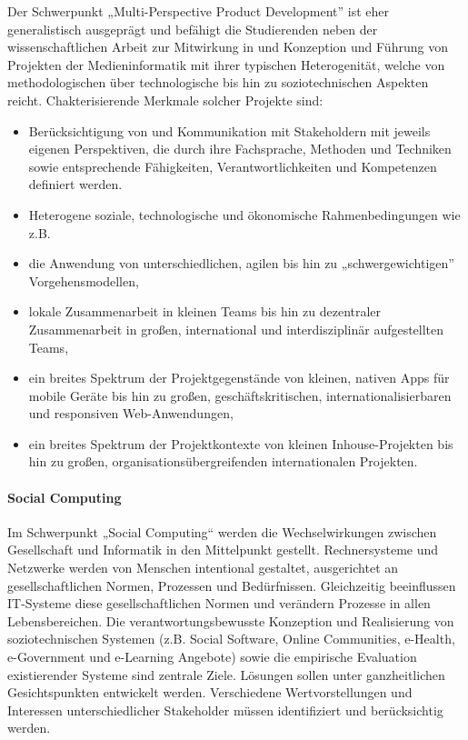 Der Schwerpunkt „Multi-Perspective Product Development'' ist eher
generalistisch ausgeprägt und befähigt die Studierenden neben der
wissenschaftlichen Arbeit zur Mitwirkung in und Konzeption und Führung
von Projekten der Medieninformatik mit ihrer typischen Heterogenität,
welche von methodologischen über technologische bis hin zu
soziotechnischen Aspekten reicht. Chakterisierende Merkmale solcher
Projekte sind:

\begin{itemize}
\tightlist
\item
  Berücksichtigung von und Kommunikation mit Stakeholdern mit jeweils
  eigenen Perspektiven, die durch ihre Fachsprache, Methoden und
  Techniken sowie entsprechende Fähigkeiten, Verantwortlichkeiten und
  Kompetenzen definiert werden.
\item
  Heterogene soziale, technologische und ökonomische Rahmenbedingungen
  wie z.B.
\item
  die Anwendung von unterschiedlichen, agilen bis hin zu
  „schwergewichtigen'' Vorgehensmodellen,
\item
  lokale Zusammenarbeit in kleinen Teams bis hin zu dezentraler
  Zusammenarbeit in großen, international und interdisziplinär
  aufgestellten Teams,
\item
  ein breites Spektrum der Projektgegenstände von kleinen, nativen Apps
  für mobile Geräte bis hin zu großen, geschäftskritischen,
  internationalisierbaren und responsiven Web-Anwendungen,
\item
  ein breites Spektrum der Projektkontexte von kleinen Inhouse-Projekten
  bis hin zu großen, organisationsübergreifenden internationalen
  Projekten.
\end{itemize}

\paragraph{Social
Computing\label{/mi-2017/selbstbericht/0400-studiengangskonzept/0000-studiengangskonzept}}\label{social-computingpathlabelmi-2017selbstbericht0400-studiengangskonzept0000-studiengangskonzept}

Im Schwerpunkt „Social Computing`` werden die Wechselwirkungen zwischen
Gesellschaft und Informatik in den Mittelpunkt gestellt. Rechnersysteme
und Netzwerke werden von Menschen intentional gestaltet, ausgerichtet an
gesellschaftlichen Normen, Prozessen und Bedürfnissen. Gleichzeitig
beeinflussen IT-Systeme diese gesellschaftlichen Normen und verändern
Prozesse in allen Lebensbereichen. Die verantwortungsbewusste Konzeption
und Realisierung von soziotechnischen Systemen (z.B. Social Software,
Online Communities, e-Health, e-Government und e-Learning Angebote)
sowie die empirische Evaluation existierender Systeme sind zentrale
Ziele. Lösungen sollen unter ganzheitlichen Gesichtspunkten entwickelt
werden. Verschiedene Wertvorstellungen und Interessen unterschiedlicher
Stakeholder müssen identifiziert und berücksichtig werden.

